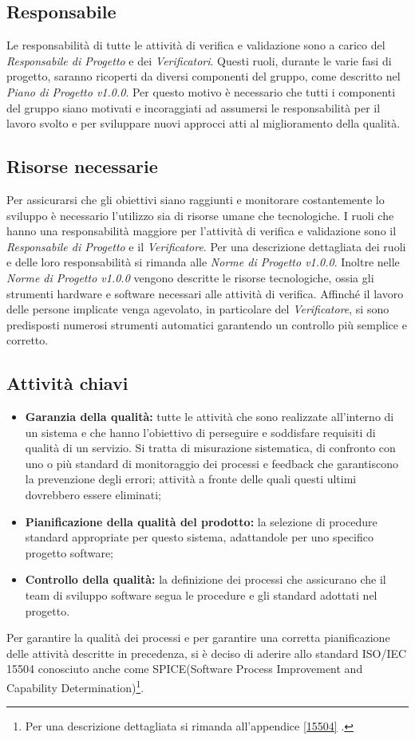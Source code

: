 \subsection{Responsabile}
Le responsabilità di tutte le attività di verifica e validazione sono a carico del \textit{Responsabile di Progetto} e dei \textit{Verificatori}. Questi ruoli, durante le varie fasi di progetto, saranno ricoperti da diversi componenti del gruppo, come descritto nel \textit{Piano di Progetto v1.0.0}. Per questo motivo è necessario che tutti i componenti del gruppo siano motivati e incoraggiati ad assumersi le responsabilità per il lavoro svolto e per sviluppare nuovi approcci atti al miglioramento della qualità.

\subsection{Risorse necessarie}
Per assicurarsi che gli obiettivi siano raggiunti e monitorare costantemente lo sviluppo è necessario l'utilizzo sia di risorse umane che tecnologiche. I ruoli che hanno una responsabilità maggiore per l'attività di verifica e validazione sono il \textit{Responsabile di Progetto} e il \textit{Verificatore}. Per una descrizione dettagliata dei ruoli e delle loro responsabilità si rimanda alle \textit{Norme di Progetto v1.0.0}. Inoltre nelle \textit{Norme di Progetto v1.0.0} vengono descritte le risorse tecnologiche, ossia gli strumenti hardware e software necessari alle attività di verifica. Affinché il lavoro delle persone implicate venga agevolato, in particolare del \textit{Verificatore}, si sono predisposti numerosi strumenti automatici garantendo un controllo più semplice e corretto.

\subsection{Attività chiavi}
\begin{itemize}
	\item \textbf{Garanzia della qualità:} tutte le attività che sono realizzate all'interno di un sistema e che hanno l'obiettivo di perseguire e soddisfare requisiti di qualità di un servizio. Si tratta di misurazione sistematica, di confronto con uno o più standard di monitoraggio dei processi e \gls{feedback} che garantiscono la prevenzione degli errori; attività a fronte delle quali questi ultimi dovrebbero essere eliminati;
	\item \textbf{Pianificazione della qualità del prodotto:} la selezione di procedure standard appropriate per questo sistema, adattandole per uno specifico progetto software;
	\item \textbf{Controllo della qualità:} la definizione dei processi che assicurano che il team  di sviluppo software segua le procedure e gli standard adottati nel progetto.
\end{itemize}
Per garantire la qualità dei processi e per garantire una corretta pianificazione delle attività descritte in precedenza, si è deciso di aderire allo standard ISO/IEC 15504 conosciuto anche come SPICE(Software Process Improvement and Capability Determination)\footnote{Per una descrizione dettagliata si rimanda all'appendice \ref{15504} .}.

